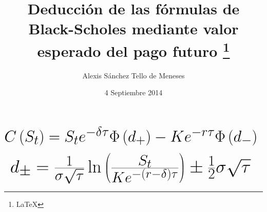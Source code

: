 \documentclass[32pt]{article}
\title{Deducci\'{o}n de las f\'{o}rmulas de Black-Scholes mediante valor esperado del pago futuro \footnote{\LaTeX}}
\author{Alexis S\'{a}nchez Tello de Meneses}
\date{4 Septiembre 2014}
\begin{document}
\maketitle

\begin{equation}
	\mbox{\Huge
	 $ C\left(S_{t}\right) = S_{t}e^{-\delta\tau}\Phi\left(d_{+}\right) - Ke^{-r\tau}\Phi\left(d_{-}\right) $ }
\end{equation}


\newline



\begin{equation}
	\mbox{\Huge
	 $ d_{\pm} = \frac{1}{\sigma\sqrt{\tau}}\ln\left(\frac{S_{t}}{Ke^{-\left(r-\delta\right)\tau}}\right)\pm
			\frac{1}{2}\sigma\sqrt{\tau} $ }
\end{equation}
\end{document}
